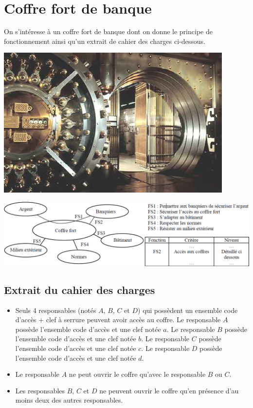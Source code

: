 \documentclass[11pt,oneside]{article}
\begin{document}
\section*{Coffre fort de banque}

\setcounter{paragraph}{0}

\begin{minipage}[c]{.45\linewidth}

On s'intéresse à un coffre fort de banque dont on donne le principe de fonctionnement ainsi qu'un extrait de cahier des charges ci-dessous.

\end{minipage}
\hfill
\begin{minipage}[c]{.45\linewidth}
\begin{center}
\includegraphics[width=.9\textwidth]{png/fig3}
\end{center}
\end{minipage}

\begin{center}
\includegraphics[width=.9\textwidth]{png/fig4}
\end{center}

\subsection*{Extrait du cahier des charges}
\begin{itemize}
\item Seuls 4 responsables (notés $A$, $B$, $C$ et $D$) qui possèdent un ensemble code d'accès + clef à serrure peuvent avoir accès au coffre. Le responsable $A$ possède l'ensemble code d'accès et une clef notée $a$. Le responsable $B$ possède l'ensemble code d'accès et une clef notée $b$. Le responsable $C$ possède l'ensemble code d'accès et une clef notée $c$. Le responsable $D$ possède l'ensemble code d'accès et une clef notée $d$.
\item Le responsable $A$ ne peut ouvrir le coffre qu'avec le responsable $B$ ou $C$.
\item Les responsables $B$, $C$ et $D$ ne peuvent ouvrir le coffre qu'en présence d'au moins deux des autres responsables.
\end{itemize}
\end{document}
